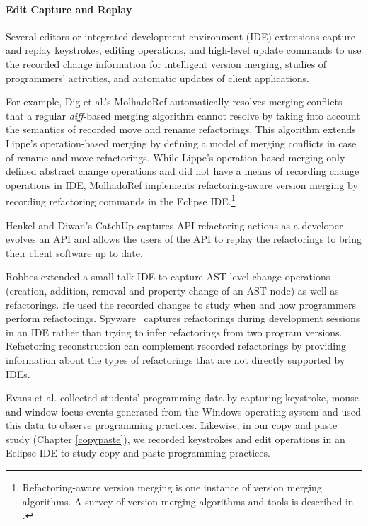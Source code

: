 \documentclass[runningheads,a4paper]{llncs}
\begin{document}
\paragraph{Edit Capture and Replay} 
Several editors or integrated development environment (IDE) extensions capture and replay keystrokes, editing operations, and high-level update commands to use the recorded change information for intelligent version merging, studies of programmers' activities, and automatic updates of client applications. 

For example, Dig et al.'s MolhadoRef \cite{Dig2007} automatically resolves merging conflicts that a regular {\it diff}-based merging algorithm cannot resolve by taking into account the semantics of recorded move and rename refactorings. This algorithm extends Lippe's operation-based merging \cite{Lippe1992} by defining a model of merging conflicts in case of rename and move refactorings. While Lippe's operation-based merging only defined abstract change operations and did not have a means of recording change operations in IDE, MolhadoRef implements refactoring-aware version merging by recording refactoring commands in the Eclipse IDE.\footnote{Refactoring-aware version merging is one instance of version merging algorithms. A survey of version merging algorithms and tools is described in \cite{Mens2002}.}

Henkel and Diwan's CatchUp \cite{Henkel2005} captures API refactoring actions as a developer evolves an API and allows the users of the API to replay the refactorings to bring their client software up to date. 

Robbes \cite{Robbes2007} extended a small talk IDE to capture AST-level change operations (creation, addition, removal and property change of an AST node) as well as refactorings. He used the recorded changes to study when and how programmers perform refactorings. Spyware~\cite{Robbes2008:spyware} captures refactorings during development sessions in an IDE rather than trying to infer refactorings from two program versions. Refactoring reconstruction can complement recorded refactorings by providing information about the types of refactorings that are not directly supported by IDEs.


Evans et al. \cite{Evans2003} collected students' programming data by capturing keystroke, mouse and window focus events generated from the Windows operating system and used this data to observe programming practices. Likewise, in our copy and paste study (Chapter \ref{copypaste}), we recorded keystrokes and edit operations in an Eclipse IDE to study copy and paste programming practices. 
\end{document}
